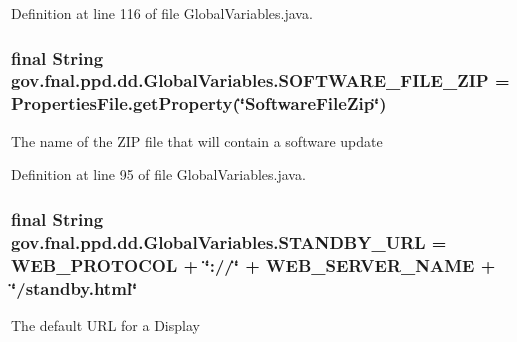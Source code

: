 Definition at line 116 of file Global\-Variables.\-java.

\hypertarget{classgov_1_1fnal_1_1ppd_1_1dd_1_1GlobalVariables_ab8e56e6480b2c30248d2e20aee782cb4}{
\subsubsection[{S\-O\-F\-T\-W\-A\-R\-E\-\_\-\-F\-I\-L\-E\-\_\-\-Z\-I\-P}]{\setlength{\rightskip}{0pt plus 5cm}final String gov.\-fnal.\-ppd.\-dd.\-Global\-Variables.\-S\-O\-F\-T\-W\-A\-R\-E\-\_\-\-F\-I\-L\-E\-\_\-\-Z\-I\-P = {\bf Properties\-File.\-get\-Property}(\char`\"{}Software\-File\-Zip\char`\"{})\hspace{0.3cm}{\ttfamily [static]}}}\label{classgov_1_1fnal_1_1ppd_1_1dd_1_1GlobalVariables_ab8e56e6480b2c30248d2e20aee782cb4}
The name of the Z\-I\-P file that will contain a software update 

Definition at line 95 of file Global\-Variables.\-java.

\hypertarget{classgov_1_1fnal_1_1ppd_1_1dd_1_1GlobalVariables_a7519a50604167fa9cf1c9e51cd4a6267}{
\subsubsection[{S\-T\-A\-N\-D\-B\-Y\-\_\-\-U\-R\-L}]{\setlength{\rightskip}{0pt plus 5cm}final String gov.\-fnal.\-ppd.\-dd.\-Global\-Variables.\-S\-T\-A\-N\-D\-B\-Y\-\_\-\-U\-R\-L = {\bf W\-E\-B\-\_\-\-P\-R\-O\-T\-O\-C\-O\-L} + \char`\"{}\-://\char`\"{} + {\bf W\-E\-B\-\_\-\-S\-E\-R\-V\-E\-R\-\_\-\-N\-A\-M\-E} + \char`\"{}/standby.\-html\char`\"{}\hspace{0.3cm}{\ttfamily [static]}}}\label{classgov_1_1fnal_1_1ppd_1_1dd_1_1GlobalVariables_a7519a50604167fa9cf1c9e51cd4a6267}
The default U\-R\-L for a Display 


